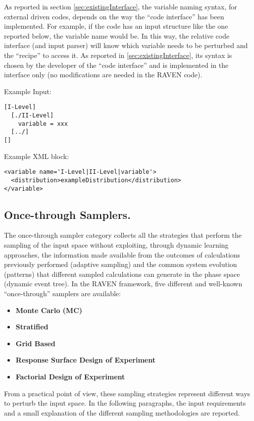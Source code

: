 As reported in section \ref{sec:existingInterface}, the variable naming syntax,
for external driven codes, depends on the way the ``code interface'' has been
implemented.
%
For example, if the code has an input structure like the one reported below, the
variable name would be.
%
In this way, the relative code interface (and input parser) will know which
variable needs to be perturbed and the ``recipe'' to access it.
%
As reported in \ref{sec:existingInterface}, its syntax is chosen by the
developer of the ``code interface'' and is implemented in the interface only
(no modifications are needed in the RAVEN code).

Example Input:
\begin{lstlisting}
[I-Level]
  [./II-Level]
    variable = xxx
  [../]
[]
\end{lstlisting}

Example XML block:
\begin{lstlisting}[style=XML]
<variable name='I-Level|II-Level|variable'>
  <distribution>exampleDistribution</distribution>
</variable>
\end{lstlisting}

\subsection{Once-through Samplers.}
\label{subsec:onceThroughSamplers}
The once-through sampler category collects all the strategies that perform the
sampling of the input space without exploiting, through dynamic learning
approaches, the information made available from the outcomes of calculations
previously performed (adaptive sampling) and the common system evolution
(patterns) that different sampled calculations can generate in the phase space
(dynamic event tree).
%
In the RAVEN framework, five different and well-known “once-through” samplers
are available:
\begin{itemize}
\item \textbf{Monte Carlo (MC)}
\item \textbf{Stratified}
\item \textbf{Grid Based}
\item \textbf{Response Surface Design of Experiment}
\item \textbf{Factorial Design of Experiment}
\end{itemize}

From a practical point of view, these sampling strategies represent different
ways to perturb the input space.
%
In the following paragraphs, the input requirements and a small explanation of
the different sampling methodologies are reported.

